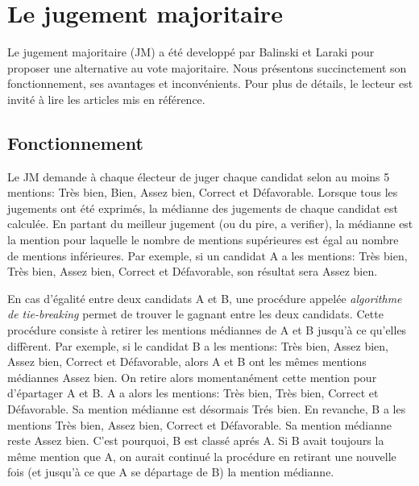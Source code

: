 \documentclass[conference]{IEEEtran}
\begin{document}



\section{Le jugement majoritaire}
\label{sec:mj}

Le jugement majoritaire (JM) a \'et\'e developp\'e par Balinski et Laraki \cite{mj} pour proposer une alternative au vote majoritaire. Nous pr\'esentons succinctement son fonctionnement, ses avantages et inconv\'enients. Pour plus de d\'etails, le lecteur est invit\'e \`a lire les articles mis en r\'ef\'erence.


\subsection{Fonctionnement}

Le JM demande \`a chaque \'electeur de juger chaque candidat selon au moins 5 mentions: Tr\`es bien, Bien, Assez bien, Correct et D\'efavorable. Lorsque tous les jugements ont \'et\'e exprim\'es, la m\'edianne des jugements de chaque candidat est calcul\'ee. En partant du meilleur jugement (ou du pire, a verifier), la m\'edianne est la mention pour laquelle le nombre de mentions sup\'erieures est \'egal au nombre de mentions inf\'erieures. Par exemple, si un candidat A a les mentions: Tr\`es bien, Tr\`es bien, Assez bien, Correct et D\'efavorable, son r\'esultat sera Assez bien. 

En cas d'\'egalit\'e entre deux candidats A et B, une proc\'edure appel\'ee \emph{algorithme de tie-breaking} permet de trouver le gagnant entre les deux candidats. Cette proc\'edure consiste \`a retirer les mentions m\'ediannes de A et B jusqu'\`a ce qu'elles diff\`erent. Par exemple, si le candidat B a les mentions: Tr\`es bien, Assez bien, Assez bien, Correct et D\'efavorable, alors A et B ont les m\^emes mentions m\'ediannes Assez bien. On retire alors momentan\'ement cette mention pour d'\'epartager A et B. A a alors les mentions: Tr\`es bien, Tr\`es bien, Correct et D\'efavorable. Sa mention m\'edianne est d\'esormais Tr\'es bien. En revanche, B a les mentions Tr\`es bien, Assez bien, Correct et D\'efavorable. Sa mention m\'edianne reste Assez bien. C'est pourquoi, B est class\'e apr\'es A. Si B avait toujours la m\^eme mention que A, on aurait continu\'e la proc\'edure en retirant une nouvelle fois (et jusqu'\`a ce que A se d\'epartage de B) la mention m\'edianne.
\end{document}
